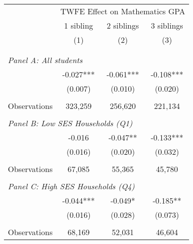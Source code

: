 \makeatletter
{}
{
\makeatother
\begin{tabular}{lccc}
\toprule
\cmidrule(lr){2-4}
& \multicolumn{3}{c}{TWFE Effect on Mathematics GPA} \\
\cmidrule(lr){2-4}
& 1 sibling & 2 siblings & 3 siblings  \\
\cmidrule(lr){2-2} \cmidrule(lr){3-3} \cmidrule(lr){4-4}
& (1) & (2) & (3)\\
\bottomrule
&  &  &  \\
&  &  &   \\
\multicolumn{4}{l}{\textit{Panel A: All students}} \\
\hspace{3mm}        &      -0.027***&      -0.061***&      -0.108***\\
                    &     (0.007)   &     (0.010)   &     (0.020)   \\
                    &               &               &               \\
\hspace{3mm}Observations&     323,259   &     256,620   &     221,134   \\
 
&  &  &   \\
\multicolumn{4}{l}{\textit{Panel B: Low SES Households (Q1)}} \\
\hspace{3mm}        &      -0.016   &      -0.047** &      -0.133***\\
                    &     (0.016)   &     (0.020)   &     (0.032)   \\
                    &               &               &               \\
\hspace{3mm}Observations&      67,085   &      55,365   &      45,780   \\
 
&  &  &   \\
\multicolumn{4}{l}{\textit{Panel C: High SES Households (Q4)}} \\
\hspace{3mm}        &      -0.044***&      -0.049*  &      -0.185** \\
                    &     (0.016)   &     (0.028)   &     (0.073)   \\
                    &               &               &               \\
\hspace{3mm}Observations&      68,169   &      52,031   &      46,604   \\
 

\end{tabular}}
